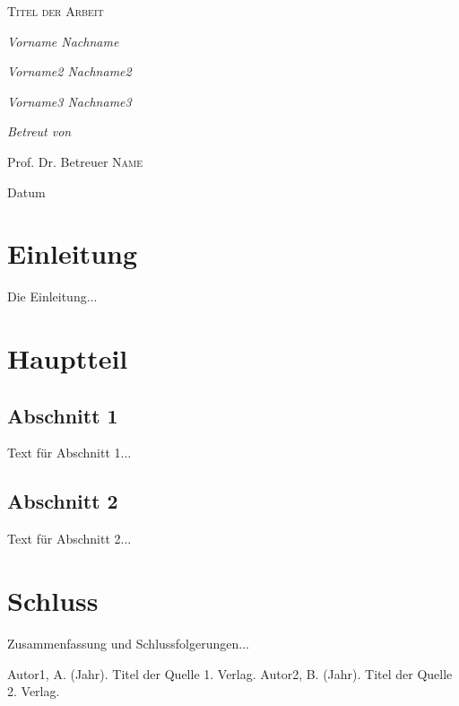 \documentclass[a4paper,12pt]{article}
\begin{document}
	
	\begin{titlepage}
		\centering
		{\scshape\LARGE Titel der Arbeit \par}
		\vspace{1cm}
		{\Large\itshape Vorname Nachname\par}
		\vspace{0.5cm}
		{\Large\itshape Vorname2 Nachname2\par}
		\vspace{0.5cm}
		{\Large\itshape Vorname3 Nachname3\par}
		\vspace{2cm}
		{\Large\itshape Betreut von\par}
		Prof. Dr. Betreuer \textsc{Name}
		
		\vfill
		
		{\large Datum\par}
	\end{titlepage}
	
	\tableofcontents
	\newpage
	
	\section{Einleitung}
	Die Einleitung...
	
	\section{Hauptteil}
	\subsection{Abschnitt 1}
	Text für Abschnitt 1...
	
	\subsection{Abschnitt 2}
	Text für Abschnitt 2...
	
	\section{Schluss}
	Zusammenfassung und Schlussfolgerungen...
	
	\begin{thebibliography}{9}
		 Autor1, A. (Jahr). Titel der Quelle 1. Verlag.
		 Autor2, B. (Jahr). Titel der Quelle 2. Verlag.
	\end{thebibliography}
	
\end{document}
